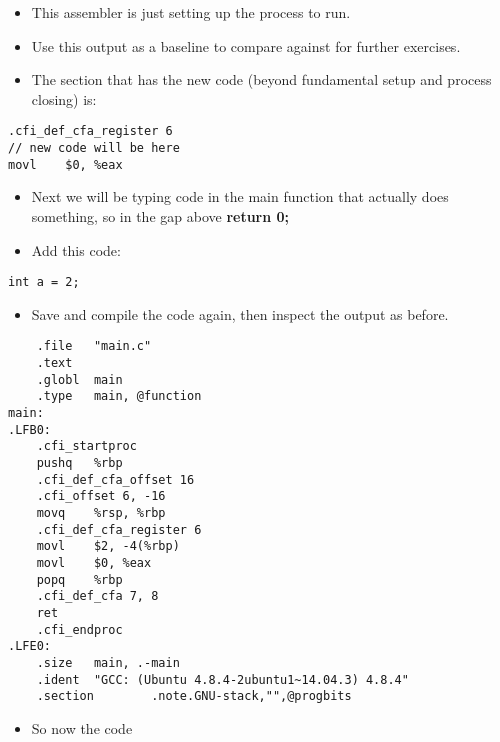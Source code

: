 \documentclass[minimal, t]{article}
\begin{document}
\begin{itemize}
\item This assembler is just setting up the process to run.
\item Use this output as a baseline to compare against for further exercises.
\item The section that has the new code (beyond fundamental setup and process
closing) is:
\end{itemize}
\begin{verbatim}
.cfi_def_cfa_register 6
// new code will be here
movl    $0, %eax
\end{verbatim}
\begin{itemize}
\item Next we will be typing code in the main function that actually does
something, so in the gap above
\textbf{return 0;}
\item Add this code:
\end{itemize}

\begin{verbatim}
int a = 2;
\end{verbatim}

\begin{itemize}
\item Save and compile the code again, then inspect the output as before.
\end{itemize}

\begin{verbatim}
	.file   "main.c"
	.text
	.globl  main
	.type   main, @function
main:
.LFB0:
	.cfi_startproc
	pushq   %rbp
	.cfi_def_cfa_offset 16
	.cfi_offset 6, -16
	movq    %rsp, %rbp
	.cfi_def_cfa_register 6
	movl    $2, -4(%rbp)
	movl    $0, %eax
	popq    %rbp
	.cfi_def_cfa 7, 8
	ret
	.cfi_endproc
.LFE0:
	.size   main, .-main
	.ident  "GCC: (Ubuntu 4.8.4-2ubuntu1~14.04.3) 4.8.4"
	.section        .note.GNU-stack,"",@progbits
\end{verbatim}

\begin{itemize}
\item So now the code
\end{itemize}
\end{document}
